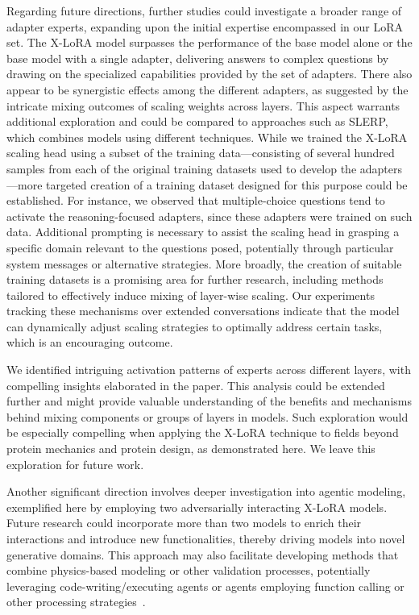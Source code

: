 Regarding future directions, further studies could investigate a broader range of adapter experts, expanding upon the initial expertise encompassed in our LoRA set. The X-LoRA model surpasses the performance of the base model alone or the base model with a single adapter, delivering answers to complex questions by drawing on the specialized capabilities provided by the set of adapters. There also appear to be synergistic effects among the different adapters, as suggested by the intricate mixing outcomes of scaling weights across layers. This aspect warrants additional exploration and could be compared to approaches such as SLERP, which combines models using different techniques. While we trained the X-LoRA scaling head using a subset of the training data—consisting of several hundred samples from each of the original training datasets used to develop the adapters—more targeted creation of a training dataset designed for this purpose could be established. For instance, we observed that multiple-choice questions tend to activate the reasoning-focused adapters, since these adapters were trained on such data. Additional prompting is necessary to assist the scaling head in grasping a specific domain relevant to the questions posed, potentially through particular system messages or alternative strategies. More broadly, the creation of suitable training datasets is a promising area for further research, including methods tailored to effectively induce mixing of layer-wise scaling. Our experiments tracking these mechanisms over extended conversations indicate that the model can dynamically adjust scaling strategies to optimally address certain tasks, which is an encouraging outcome.

We identified intriguing activation patterns of experts across different layers, with compelling insights elaborated in the paper. This analysis could be extended further and might provide valuable understanding of the benefits and mechanisms behind mixing components or groups of layers in models. Such exploration would be especially compelling when applying the X-LoRA technique to fields beyond protein mechanics and protein design, as demonstrated here. We leave this exploration for future work.

Another significant direction involves deeper investigation into agentic modeling, exemplified here by employing two adversarially interacting X-LoRA models. Future research could incorporate more than two models to enrich their interactions and introduce new functionalities, thereby driving models into novel generative domains. This approach may also facilitate developing methods that combine physics-based modeling or other validation processes, potentially leveraging code-writing/executing agents or agents employing function calling or other processing strategies~\cite{Ghafarollahi2024ProtAgents:Learning}.

